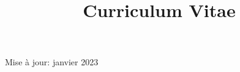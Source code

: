 \documentclass[a4paper,12pt]{curve}
\title{Curriculum Vitae}
\begin{document}
            \makeheaders[t]
            \maketitle
            \begin{center}
Mise à jour: janvier 2023
\end{center}
            \vfill
            
\end{document}
